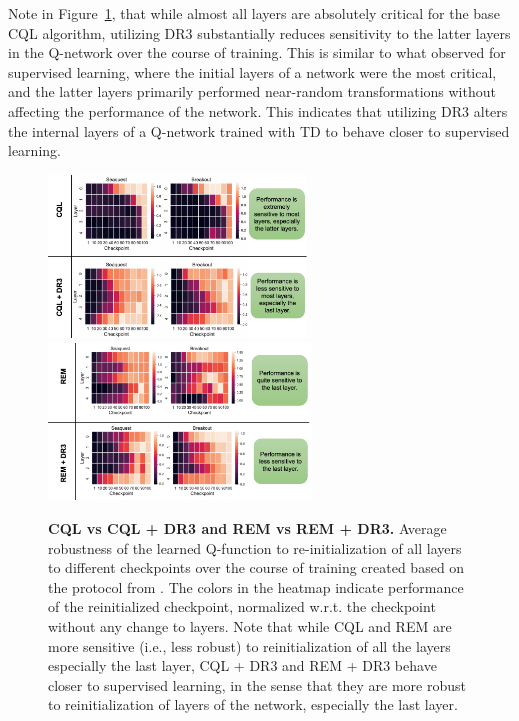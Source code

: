 Note in Figure~\ref{fig:robustness}, that while almost all layers are absolutely critical for the base CQL algorithm, 
utilizing DR3 substantially reduces sensitivity to the latter layers in the Q-network over the course of training. This is similar to what \citet{zhang2019all} observed for supervised learning, where the initial layers of a network were the most critical, and the latter layers primarily performed near-random transformations without affecting the performance of the network. This indicates that utilizing DR3 alters the internal layers of a Q-network trained with TD to behave closer to supervised learning.

\begin{figure}[H]
    \centering
    \includegraphics[width=0.612\textwidth]{chapters/dr3/figures/robustness_figures/layer_robustness_cql.pdf}
    \vspace{0.4cm}
    \includegraphics[width=0.622\textwidth]{chapters/dr3/figures/robustness_figures/rem_robustness_final.pdf}
    \vspace{-5pt}
    \caption{\footnotesize{\label{fig:robustness} \textbf{CQL vs CQL + DR3 and REM vs REM + DR3.} Average robustness of the learned Q-function to re-initialization of all layers to different checkpoints over the course of training created based on the protocol from \citet{zhang2019all}. The colors in the heatmap indicate performance of the reinitialized checkpoint, normalized w.r.t. the checkpoint without any change to layers. Note that while CQL and REM are more sensitive (i.e., less robust) to reinitialization of all the layers especially the last layer, CQL + DR3 and REM + DR3 behave closer to supervised learning, in the sense that they are more robust to reinitialization of layers of the network, especially the last layer.}}

\end{figure}
